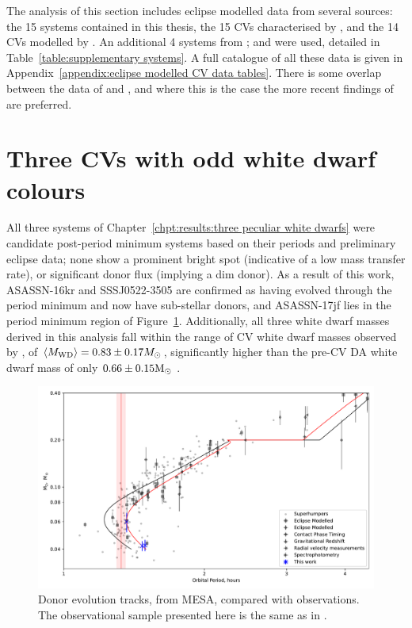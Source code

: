 \label{chpt:discussion} %

The analysis of this section includes eclipse modelled data from several sources: the 15 systems contained in this thesis, the 15 CVs characterised by \citet{McAllister2019}, and the 14 CVs modelled by \citet{Savoury2011}. An additional 4 systems from \citet{mcallister2015,mcallister2017, mcallister2017b}; and \citet{copperwheat2010} were used, detailed in Table~\ref{table:supplementary systems}. A full catalogue of all these data is given in Appendix~\ref{appendix:eclipse modelled CV data tables}.
There is some overlap between the data of \citet{McAllister2019} and \citet{Savoury2011}, and where this is the case the more recent findings of \citet{McAllister2019} are preferred.


\section{Three CVs with odd white dwarf colours}
\label{sect:discussion:three CVs with peculiar white dwarf colours}

All three systems of Chapter~\ref{chpt:results:three peculiar white dwarfs} were candidate post-period minimum systems based on their periods and preliminary eclipse data; none show a prominent bright spot (indicative of a low mass transfer rate), or significant donor flux (implying a dim donor).
As a result of this work, ASASSN-16kr and SSSJ0522-3505 are confirmed as having evolved through the period minimum and now have sub-stellar donors, and ASASSN-17jf lies in the period minimum region of Figure~\ref{fig:M2_vs_P}.
Additionally, all three white dwarf masses derived in this analysis fall within the range of CV white dwarf masses observed by \citet{pala2020}, of $\langle M_{\rm WD}\rangle = 0.83 \pm 0.17 M_\odot$, significantly higher than the pre-CV DA white dwarf mass of only $0.66 \pm 0.15 {\rm M_\odot}$ \citep{mccleery2020}.
\begin{figure}
    \centering
    \includegraphics[width=\textwidth]{figures/results/three_cvs_with_weird_colours/GeneralFigs/M2_vs_P_withhumpers.pdf}
    \caption{Donor evolution tracks, from MESA, compared with observations. The observational sample presented here is the same as in \citet{wild2021}.}
    \label{fig:M2_vs_P}
\end{figure}

